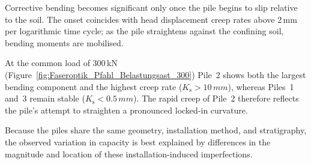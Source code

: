 {{{{{{\begin{figure*}[!ht]
	\centering
	\caption{Bending moments about the weak axis at load stages of 300\,kN (left) and 500\,kN (right) for the three investigated piles.}
	\label{fig:Biegung}
\end{figure*}



Corrective bending becomes significant only once the pile begins to slip relative to the soil.
The onset coincides with head displacement creep rates above 2\,mm per logarithmic time cycle; as the pile straightens against the confining soil, bending moments are mobilised.

At the common load of 300\,kN (Figure~\ref{fig:Faseroptik_Pfahl_Belastungsast_300}) Pile~2 shows both the largest bending component and the highest creep rate ($K_{\mathrm{s}} > 10\,mm$), whereas Piles~1 and~3 remain stable ($K_{\mathrm{s}} < 0.5\,mm$).
The rapid creep of Pile~2 therefore reflects the pile's attempt to straighten a pronounced locked-in curvature.

Because the piles share the same geometry, installation method, and stratigraphy, the observed variation in capacity is best explained by differences in the magnitude and location of these installation-induced imperfections.



\begin{figure*}[!ht]
	\centering
	\caption{Comparison of fibre-optic strain measurements for the three piles at the 300\,kN load stage}
	\label{fig:Faseroptik_Pfahl_Belastungsast_300}
\end{figure*}




}}}}}}
